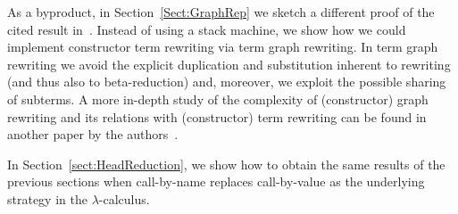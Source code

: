 \documentclass{LMCS}
\begin{document}
As a byproduct, in Section~\ref{Sect:GraphRep} we sketch a different proof
of the cited result in~\cite{Sands:Lambda02}. Instead of using a stack machine, 
we show how we could implement
constructor term rewriting via term graph rewriting. In term graph rewriting we
avoid the explicit duplication and substitution inherent to
rewriting (and thus also to beta-reduction) and, moreover, we exploit the possible sharing of subterms. 
A more in-depth study of the complexity of 
(constructor) graph rewriting and its relations with (constructor) term rewriting can be found in another
paper by the authors~\cite{DLM09}.

In Section~\ref{sect:HeadReduction}, we show how to obtain the same results of the previous sections when 
call-by-name replaces call-by-value as the underlying strategy in the $\lambda$-calculus.
\end{document}

